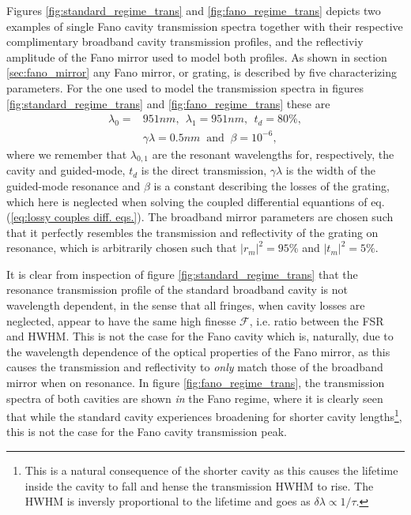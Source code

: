 Figures \ref{fig:standard_regime_trans} and \ref{fig:fano_regime_trans} depicts two examples of single Fano cavity transmission spectra together with their respective complimentary broadband cavity transmission profiles, and the reflectiviy amplitude of the Fano mirror used to model both profiles. As shown in section \ref{sec:fano_mirror} any Fano mirror, or grating, is described by five characterizing parameters. For the one used to model the transmission spectra in figures \ref{fig:standard_regime_trans} and \ref{fig:fano_regime_trans}  these are 
\begin{equation}
    \begin{split}
    \lambda_0 = &951 nm,\:\: \lambda_1 = 951 nm,\:\: t_d = 80\%,\\ &\gamma \lambda = 0.5 nm\: \text{ and }\: \beta = 10^{-6},
    \end{split}
\end{equation}
where we remember that $\lambda_{0,1}$ are the resonant wavelengths for, respectively, the cavity and guided-mode, $t_d$ is the direct transmission, $\gamma \lambda$ is the width of the guided-mode resonance and $\beta$ is a constant describing the losses of the grating, which here is neglected when solving the coupled differential equantions of eq. (\ref{eq:lossy couples diff. eqs.}). The broadband mirror parameters are chosen such that it perfectly resembles the transmission and reflectivity of the grating on resonance, which is arbitrarily chosen such that $|r_{m}|^2=95\%$ and $|t_{m}|^2 = 5\%$.

 

It is clear from inspection of figure \ref{fig:standard_regime_trans} that the resonance transmission profile of the standard broadband cavity is not wavelength dependent, in the sense that all fringes, when cavity losses are neglected, appear to have the same high finesse $\mathcal{F}$, i.e. ratio between the FSR and HWHM. This is not the case for the Fano cavity which is, naturally, due to the wavelength dependence of the optical properties of the Fano mirror, as this causes the transmission and reflectivity to \emph{only} match those of the broadband mirror when on resonance. In figure \ref{fig:fano_regime_trans}, the transmission spectra of both cavities are shown \emph{in} the Fano regime, where it is clearly seen that while the standard cavity experiences broadening for shorter cavity lengths\footnote{This is a natural consequence of the shorter cavity as this causes the lifetime inside the cavity to fall and hense the transmission HWHM to rise. The HWHM is inversly proportional to the lifetime and goes as $\delta \lambda \propto 1/\tau$.}, this is not the case for the Fano cavity transmission peak.

